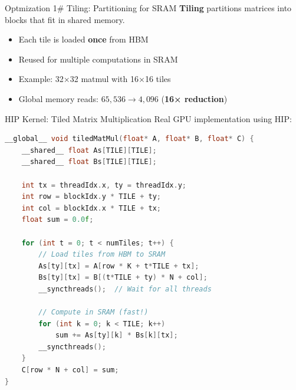 \documentclass[aspectratio=169,10pt]{beamer}
\begin{document}
\begin{frame}{Optmization 1# Tiling: Partitioning for SRAM}
    \textbf{Tiling} partitions matrices into blocks that fit in shared memory.

    \vspace{0.3cm}
    \begin{itemize}
        \item Each tile is loaded \textbf{once} from HBM
        \item Reused for multiple computations in SRAM
        \item Example: 32×32 matmul with 16×16 tiles
        \item Global memory reads: $65{,}536 \to 4{,}096$ (\textbf{16× reduction})
    \end{itemize}


\end{frame}

\begin{frame}[fragile]{HIP Kernel: Tiled Matrix Multiplication}
    Real GPU implementation using HIP:

    \vspace{0.3cm}
    \begin{lstlisting}[language=C++]
__global__ void tiledMatMul(float* A, float* B, float* C) {
    __shared__ float As[TILE][TILE];
    __shared__ float Bs[TILE][TILE];

    int tx = threadIdx.x, ty = threadIdx.y;
    int row = blockIdx.y * TILE + ty;
    int col = blockIdx.x * TILE + tx;
    float sum = 0.0f;

    for (int t = 0; t < numTiles; t++) {
        // Load tiles from HBM to SRAM
        As[ty][tx] = A[row * K + t*TILE + tx];
        Bs[ty][tx] = B[(t*TILE + ty) * N + col];
        __syncthreads();  // Wait for all threads

        // Compute in SRAM (fast!)
        for (int k = 0; k < TILE; k++)
            sum += As[ty][k] * Bs[k][tx];
        __syncthreads();
    }
    C[row * N + col] = sum;
}
    \end{lstlisting}


\end{frame}
\end{document}

